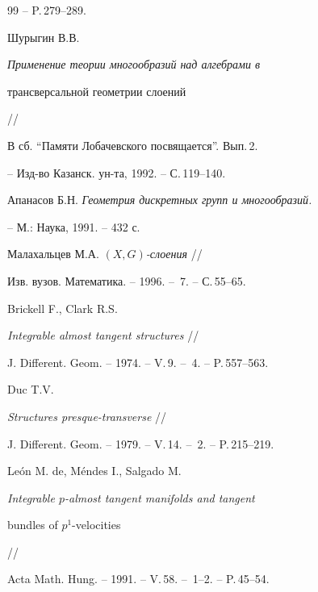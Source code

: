 \begin{thebibliography}{99}
-- P.\,279--289.







Шурыгин В.В.


{\it Применение теории многообразий над алгебрами в


трансверсальной геометрии слоений} //


В сб. ``Памяти Лобачевского посвящается''. Вып.\,2.


-- Изд-во Казанск. ун-та, 1992. -- С.\,119--140.







Апанасов Б.Н. {\it Геометрия дискретных групп и многообразий.}


-- М.: Наука, 1991. -- 432 с.







Малахальцев М.А. {\it $(X,G)$-слоения} //


Изв. вузов. Математика. -- 1996. -- \No\,7. -- С.\,55--65.







Brickell F., Clark R.S.


{\it Integrable almost tangent structures} //


J. Different. Geom. -- 1974. -- V.\,9. -- \No\,4. -- P.\,557--563.







Duc T.V.


{\it Structures presque-transverse} //


J. Different. Geom. -- 1979. -- V.\,14. -- \No\,2. -- P.\,215--219.







Le\'on M. de, M\'endes I., Salgado M.


{\it Integrable $p$-almost tangent manifolds and tangent


bundles of $p^1$-velocities} //


Acta Math. Hung. -- 1991. -- V.\,58. -- \No\No\,1--2. -- P.\,45--54.






\end{thebibliography}
